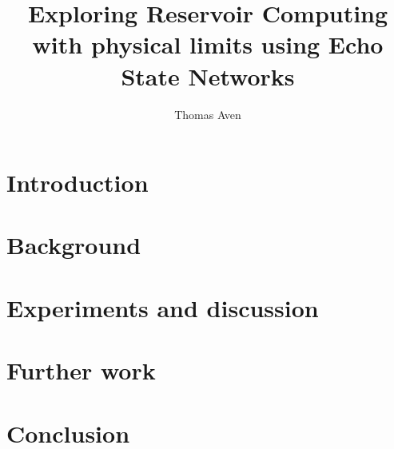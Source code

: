 \documentclass[journal]{IEEEtran}
\begin{document}
\title{Exploring Reservoir Computing with physical limits using Echo State Networks}
\author{Thomas Aven}
\date{}
\maketitle



\section{Introduction}


\section{Background}


\section{Experiments and discussion}


\section{Further work}


\section{Conclusion}





\end{document}
